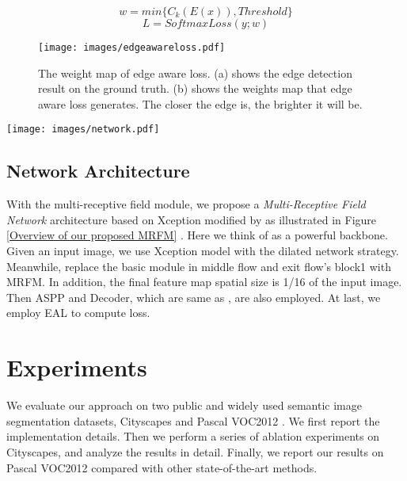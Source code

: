 \documentclass[final]{cvpr}
\begin{document}
\begin{equation}\label{weight equation}
  w = min\{C_{k}(E(x)), Threshold\}
\end{equation}
\begin{equation}\label{EAL equation}
  L = SoftmaxLoss(y;w)
\end{equation}


\begin{figure}
\begin{center}
\texttt{[image: images/edgeawareloss.pdf]}
\end{center}
\caption{The weight map of edge aware loss. (a) shows the edge detection result on the ground truth. (b) shows the weights map that edge aware loss generates. The closer the edge is, the brighter it will be.}
\label{edgewareloss}
\end{figure}


\begin{figure*}[ht]
\begin{center}
\texttt{[image: images/network.pdf]}
\end{center}
\caption{Overview of Multi Receptive Field Network Architecture.}
\label{Overview of our proposed MRFM}
\end{figure*}


\subsection{Network Architecture}

With the multi-receptive field module, we propose a \emph{Multi-Receptive Field Network} architecture based on Xception modified by \cite{Deeplabv3+} as illustrated in Figure \ref{Overview of our proposed MRFM} . Here we think of \cite{Deeplabv3+} as a powerful backbone. Given an input image, we use Xception model with the dilated network strategy. Meanwhile, replace the basic module in middle flow and exit flow's block1 with MRFM. In addition, the final feature map spatial size is 1/16 of the input image. Then ASPP and Decoder, which are same as \cite{Deeplabv3+}, are also employed. At last, we employ EAL to compute loss.



\section{Experiments}

We evaluate our approach on two public and widely used semantic image segmentation datasets, Cityscapes \cite{cityscpaes} and Pascal VOC2012 \cite{everingham2012pascal}. We first report the implementation details. Then we perform a series of ablation experiments on Cityscapes, and analyze the results in detail. Finally, we report our results on Pascal VOC2012 compared with other state-of-the-art methods.
\end{document}
